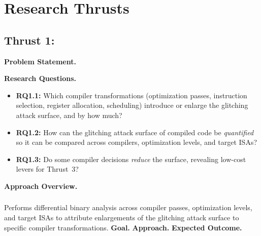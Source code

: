 \section{Research Thrusts}


\subsection{Thrust 1: \thrustone}
\label{sec:thrust1}

\noindent\textbf{Problem Statement.}

\smallskip
\noindent\textbf{Research Questions.}
\begin{itemize}[leftmargin=*,nosep]
  \item \textbf{RQ1.1:} Which compiler transformations (optimization passes, instruction selection, register allocation, scheduling) introduce or enlarge the glitching attack surface, and by how much?
  \item \textbf{RQ1.2:} How can the glitching attack surface of compiled code be \emph{quantified} so it can be compared across compilers, optimization levels, and target ISAs?
  \item \textbf{RQ1.3:} Do some compiler decisions \emph{reduce} the surface, revealing low-cost levers for Thrust~3?
\end{itemize}

\smallskip
\noindent\textbf{Approach Overview.}

\subsubsection{\researchoneone}
Performs differential binary analysis across compiler passes, optimization levels, and target ISAs to attribute enlargements of the glitching attack surface to specific compiler transformations.
\noindent\textbf{Goal.} %
\noindent\textbf{Approach.} %
\noindent\textbf{Expected Outcome.} %


